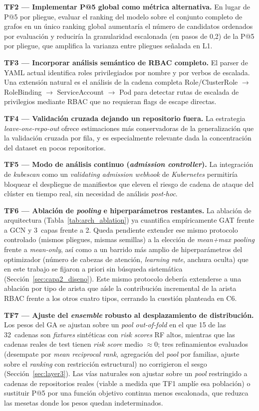 \textbf{TF2 — Implementar P@5 global como métrica alternativa.} En lugar de P@5 por
pliegue, evaluar el ranking del modelo sobre el conjunto completo de grafos en un único
ranking global aumentaría el número de candidatos ordenados por evaluación y reduciría
la granularidad escalonada (en pasos de 0,2) de la P@5 por pliegue, que amplifica la
varianza entre pliegues señalada en L1.

\textbf{TF3 — Incorporar análisis semántico de \ac{RBAC} completo.} El parser de \acs{YAML}
actual identifica roles privilegiados por nombre y por verbos de escalada. Una extensión
natural es el análisis de la cadena completa Role/ClusterRole \(\to\) RoleBinding \(\to\)
ServiceAccount \(\to\) Pod para detectar rutas de escalada de privilegios mediante
\ac{RBAC} que no requieran flags de escape directas.

\textbf{TF4 — Validación cruzada dejando un repositorio fuera.} La estrategia
\textit{leave-one-repo-out} ofrece estimaciones más conservadoras de la generalización
que la validación cruzada por fila, y es especialmente relevante dada la concentración
del dataset en pocos repositorios.

\textbf{TF5 — Modo de análisis continuo (\textit{admission controller}).} La integración
de \textit{kubescan} como un \textit{validating admission webhook} de \textit{Kubernetes}
permitiría bloquear el despliegue de manifiestos que eleven el riesgo de cadena de
ataque del clúster en tiempo real, sin necesidad de análisis \textit{post-hoc}.

\textbf{TF6 — Ablación de \textit{pooling} e hiperparámetros restantes.} La
ablación de arquitectura (Tabla~\ref{tab:arch_ablation}) ya cuantifica
empíricamente \ac{GAT} frente a \ac{GCN} y 3~capas frente a 2. Queda pendiente
extender ese mismo protocolo controlado (mismos pliegues, mismas semillas) a la
elección de \textit{mean+max pooling} frente a \textit{mean-only}, así como a un
barrido más amplio de hiperparámetros del optimizador (número de cabezas de
atención, \textit{learning rate}, anchura oculta) que en este trabajo se fijaron
a priori sin búsqueda sistemática (Sección~\ref{sec:capa2_diseno}). Este mismo
protocolo debería extenderse a una ablación por tipo de arista que aísle la
contribución incremental de la arista \ac{RBAC} frente a los otros cuatro tipos,
cerrando la cuestión planteada en C6.

\textbf{TF7 — Ajuste del \textit{ensemble} robusto al desplazamiento de
distribución.} Los pesos del \ac{GA} se ajustan sobre un \textit{pool
out-of-fold} en el que 15 de las 32~cadenas son \textit{fixtures} sintéticas con
\textit{risk scores} \ac{RF} altos, mientras que las cadenas reales de test
tienen \textit{risk score} medio \(\approx\)0; tres refinamientos evaluados
(desempate por \textit{mean reciprocal rank}, agregación del \textit{pool} por
familias, ajuste sobre el \textit{ranking} con restricción estructural) no
corrigieron el sesgo (Sección~\ref{sec:layer3}). Las vías naturales son ajustar
sobre un \textit{pool} restringido a cadenas de repositorios reales (viable a
medida que TF1 amplíe esa población) o sustituir P@5 por una función objetivo
continua menos escalonada, que reduzca las mesetas donde los pesos quedan
indeterminados.

